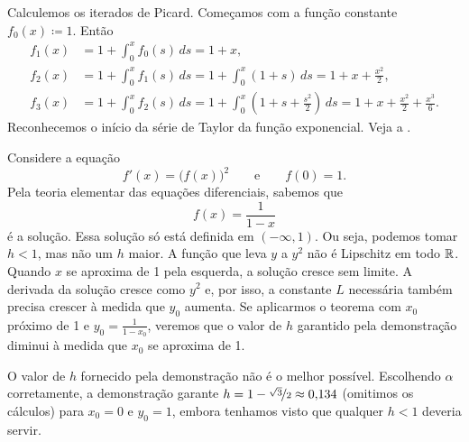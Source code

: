 \begin{example}
Calculemos os iterados de Picard.
Começamos com a função constante $f_0(x) \coloneqq 1$. Então
\begin{align*}
f_1(x) & = 1 + \int_0^x f_0(s)\,ds =
1+x, \\
f_2(x) & = 1 + \int_0^x f_1(s)\,ds =
1 + \int_0^x (1+s)\,ds = 1 + x + \frac{x^2}{2}, \\
f_3(x) & = 1 + \int_0^x f_2(s)\,ds =
1 + \int_0^x \left(1+ s + \frac{s^2}{2} \right)\,ds =
1 + x + \frac{x^2}{2} + \frac{x^3}{6} .
\end{align*}
Reconhecemos o início da série de Taylor da função exponencial.
Veja a .
\begin{myfigureht}
\caption{A função exponencial (curva contínua) e os iterados $f_0$, $f_1$,
$f_2$ e $f_3$ (tracejados).\label{fig:exppicard}}
\end{myfigureht}
\end{example}

\begin{example}
Considere a equação
\begin{equation*}
f'(x) = {\bigl(f(x)\bigr)}^2 \qquad \text{e} \qquad f(0)=1.
\end{equation*}
Pela teoria elementar das equações diferenciais, sabemos que
\begin{equation*}
f(x) = \frac{1}{1-x}
\end{equation*}
é a solução.
Essa solução só está definida em $(-\infty,1)$. Ou seja, podemos tomar
$h < 1$, mas não um $h$ maior.
A função que leva $y$ a $y^2$ não é Lipschitz em todo ${\mathbb{R}}$.
Quando $x$ se aproxima de 1 pela esquerda, a solução cresce sem limite.
A derivada da solução cresce como $y^2$ e, por isso, a constante $L$
necessária também precisa crescer à medida que $y_0$ aumenta.
Se aplicarmos o teorema com $x_0$ próximo de 1 e
$y_0 = \frac{1}{1-x_0}$, veremos que o valor de $h$ garantido pela
demonstração diminui à medida que $x_0$ se aproxima de 1.

O valor de $h$ fornecido pela demonstração não é o melhor possível.
Escolhendo $\alpha$ corretamente, a demonstração garante
$h=1-\nicefrac{\sqrt{3}}{2} \approx 0{,}134$ (omitimos os cálculos) para
$x_0=0$ e $y_0=1$, embora tenhamos visto que qualquer $h < 1$ deveria
servir.
\end{example}

